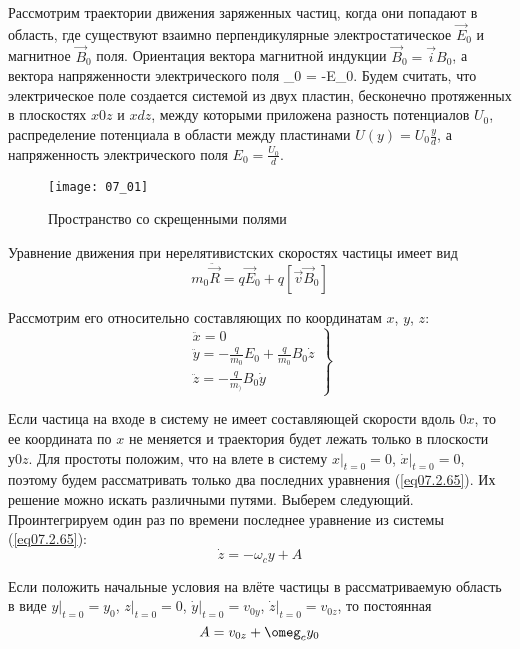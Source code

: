 
Рассмотрим траектории движения заряженных частиц, когда они попадают в 
область, где существуют взаимно перпендикулярные электростатическое 
\( \vec{E}_0 \) и магнитное \( \vec{B}_0 \) поля. Ориентация вектора магнитной 
индукции \( \vec{B}_0 = \vec{i}B_0 \), а вектора напряженности электрического 
поля _0 = -E_0. Будем считать, что электрическое поле создается 
системой из двух пластин, бесконечно протяженных в плоскостях \( x0z \) и 
\( xdz \), между которыми приложена разность потенциалов \( U_0 \), 
распределение потенциала в области между пластинами 
\( U(y) = U_0 \frac{y}{d} \), а напряженность электрического поля 
\( E_0 = \frac{U_0}{d} \).

\begin{figure}[h!]
	\center
	\texttt{[image: 07\_01]}
	\caption{Пространство со скрещенными полями}
	\label{img07.1}
\end{figure}

Уравнение движения при нерелятивистских скоростях частицы имеет вид
\[
	m_0 \ddot{\vec{R}} = q\vec{E}_0 + q\left[ \vec{v}\vec{B}_0 \right]
\]

Рассмотрим его относительно составляющих по координатам 
\( x \), \( y \), \( z \):
\begin{equation}
	\left. \begin{array}{c}
		\ddot{x} = 0 \\
		\ddot{y} = -\frac{q}{m_0}E_0 + \frac{q}{m_0}B_0 \dot{z} \\
		\ddot{z} = -\frac{q}{m_)}B_0 \dot{y}
	\end{array} \right\}
	\label{eq07.2.65}
\end{equation}

Если частица на входе в систему не имеет составляющей скорости вдоль \( 0x \), 
то ее координата по \( x \) не меняется и траектория будет лежать только в 
плоскости \( у0z \). Для простоты положим, что на влете в систему 
\( x\Big|_{t=0} = 0\), \( \dot{x}\Big|_{t=0} = 0 \), поэтому будем 
рассматривать только два последних уравнения (\ref{eq07.2.65}). Их решение 
можно искать различными путями. Выберем следующий. Проинтегрируем один раз 
по времени последнее уравнение из системы (\ref{eq07.2.65}):
\begin{equation}
	\dot{z} = -\omega_c y + A
	\label{eq07.2.66}
\end{equation}

Если положить начальные условия на влёте частицы в рассматриваемую область в 
виде \( y\Big|_{t=0} = y_0 \), \( z\Big|_{t=0} = 0 \), 
\( \dot{y}\Big|_{t=0} = v_{0y} \), \( \dot{z}\Big|_{t=0} = v_{0z} \), то 
постоянная
\begin{equation}
	A = v_{0z} + \omeg_c y_0
	\label{eq07.2.67}
\end{equation}

